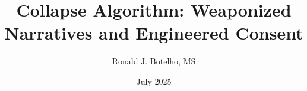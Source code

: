 \documentclass[12pt]{book}
\title{Collapse Algorithm: Weaponized Narratives and Engineered Consent}
\author{Ronald J. Botelho, MS}
\date{July 2025}
\begin{document}
\frontmatter
\maketitle
\tableofcontents
\listoffigures
\listoflistings

\mainmatter



% 

\backmatter
\printbibliography
\end{document}
